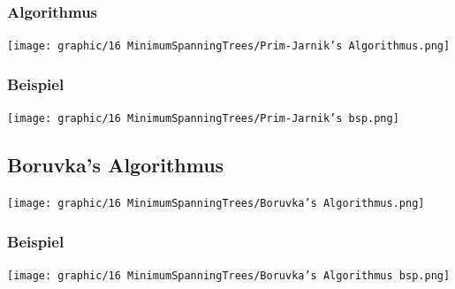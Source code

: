 \subsubsection{Algorithmus}
\begin{center}
    \texttt{[image: graphic/16 MinimumSpanningTrees/Prim-Jarnik’s Algorithmus.png]}
\end{center}
\vspace{-8pt}

\subsubsection{Beispiel}
\begin{center}
    \texttt{[image: graphic/16 MinimumSpanningTrees/Prim-Jarnik’s bsp.png]}
\end{center}
\vspace{-8pt}

\subsection{Boruvka’s Algorithmus}
\begin{center}
    \texttt{[image: graphic/16 MinimumSpanningTrees/Boruvka’s Algorithmus.png]}
\end{center}
\vspace{-8pt}
\subsubsection{Beispiel}
\begin{center}
    \texttt{[image: graphic/16 MinimumSpanningTrees/Boruvka’s Algorithmus bsp.png]}
\end{center}
\vspace{-8pt}


\newpage